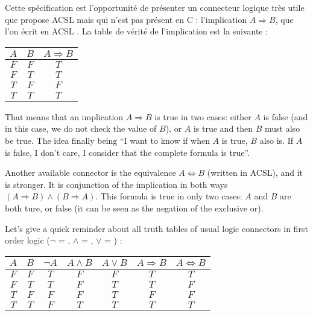 \documentclass[middle]{zmdocument}
\begin{document}
Cette spécification est l'opportunité de présenter un connecteur logique 
très utile que propose ACSL mais qui n'est pas présent en C : 
l'implication $A \Rightarrow B$, que l'on écrit en ACSL .
La table de vérité de l'implication est la suivante :



\begin{longtabu}{|c|c|c|} \hline
$A$ & $B$ & $A \Rightarrow B$ \\ \hline
$F$ & $F$ & $T$ \\ \hline
$F$ & $T$ & $T$ \\ \hline
$T$ & $F$ & $F$ \\ \hline
$T$ & $T$ & $T$ \\ \hline
\end{longtabu}



That means that an implication $A \Rightarrow B$ is true in two cases:
either $A$ is false (and in this case, we do not check the value of
$B$), or $A$ is true and then $B$ must also be true. The idea
finally being ``I want to know if when $A$ is true, $B$ also is. If
$A$ is false, I don't care, I consider that the complete formula is
true''.



Another available connector is the equivalence $A \Leftrightarrow B$
(written  in ACSL), and it is
stronger. It is conjunction of the implication in both ways
$(A \Rightarrow B) \wedge (B \Rightarrow A)$. This formula is true in
only two cases: $A$ and $B$ are both ture, or false (it can be seen
as the negation of the exclusive or).



\begin{Information}
  Let's give a quick reminder about all
  truth tables of usual logic connectors in first order logic
  ($\neg$ = \CodeInline{!}, $\wedge$ = \CodeInline{\&\&}, $\vee$ = \CodeInline{||}) :

\begin{longtabu}{|c|c|c|c|c|c|c|} \hline
$A$ & $B$ & $\neg A$ & $A \wedge B$ & $A \vee B$ & $A \Rightarrow B$ & $A \Leftrightarrow B$ \\ \hline
$F$ & $F$ & $T$ & $F$ & $F$ & $T$ & $T$ \\ \hline
$F$ & $T$ & $T$ & $F$ & $T$ & $T$ & $F$ \\ \hline
$T$ & $F$ & $F$ & $F$ & $T$ & $F$ & $F$ \\ \hline
$T$ & $T$ & $F$ & $T$ & $T$ & $T$ & $T$ \\ \hline
\end{longtabu}
\end{Information}
\end{document}
